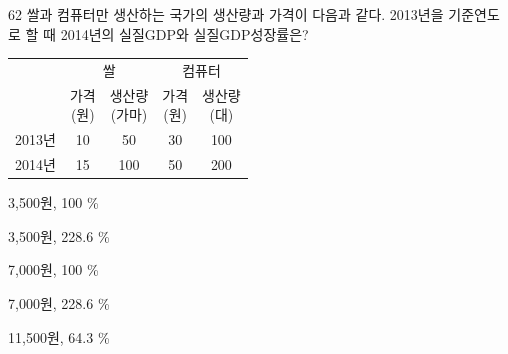 \begin{question}{62}
쌀과 컴퓨터만 생산하는 국가의 생산량과 가격이 다음과 같다. 2013년을 기준연도로 할 때 2014년의 실질GDP와 실질GDP성장률은?
\par{\small\centering\begin{tabular}{|c|c|c|c|c|}\hline
 & \multicolumn{2}{c|}{쌀} & \multicolumn{2}{c|}{컴퓨터} \\ \cline{2-5}
 & \makecell{가격\\(원)} & \makecell{생산량\\(가마)} & \makecell{가격\\(원)} & \makecell{생산량\\(대)} \\ \hline
2013년 & 10 & 50 & 30 & 100 \\ \hline
2014년 & 15 & 100 & 50 & 200 \\ \hline
\end{tabular}\par}
\begin{choices}
  \item 3,500원, 100 \%
  \item 3,500원, 228.6 \%
  \item 7,000원, 100 \%
  \item 7,000원, 228.6 \%
  \item 11,500원, 64.3 \%
\end{choices}
\end{question}

